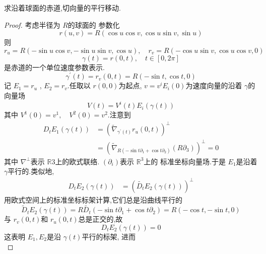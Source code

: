 \documentclass[../../main.tex]{subfiles}
\begin{document}
\begin{problemsec}
    
\end{problemsec}


\begin{problem}
    求沿着球面的赤道,切向量的平行移动.
\end{problem}
\begin{proof}
    考虑半径为 \(  R  \)的球面的 参数化 \[
    r\left( u,v \right)= R\left( \cos u \cos v,\cos u\sin v,\sin u \right) 
    \] 则 \[
    r_{u}= R\left( -\sin u\cos v,-\sin u\sin v,\cos u \right),\quad r_{v}= R\left( -\cos u\sin v,\cos u\cos v,0 \right)  
    \] \[
     \gamma \left( t \right)=  r\left( 0,t \right),\quad t\in [0,2\pi ]  
    \]是赤道的一个单位速度参数表示. \[
     \gamma ^{\prime} \left( t \right)= r_{v}\left( 0,t \right)  = R\left( - \sin t,\cos t,0 \right) 
    \]记 \(  E_1= r_{u}  \) , \(  E_2=  r_{v}  \).任取以 \(  r\left( 0,0 \right)   \)为起点, \(  v= v^{i}E_{i}\left( 0 \right)   \)为速度向量的沿着 \(   \gamma   \)的 向量场 \[
    V\left( t \right)=  V^{i}\left( t \right)E_{i}\left(  \gamma \left( t \right)  \right)  
    \]其中 \(  V^{1}\left( 0 \right)= v^{1},\quad V^{2}\left( 0 \right)= v^{2}    \).注意到 \[
    \begin{aligned}
    D_{t}E_1\left(  \gamma \left( t \right)  \right)&= \left(  \tilde{\nabla} _{ \gamma ^{\prime} \left( t \right) }r_{u}\left( 0,t \right) \right)^{\perp} \\ 
     &=     \left( \tilde{\nabla} _{R\left( -\sin t  \partial _{1}+ \cos t  \partial _{2} \right) }\left( R \partial _{3} \right) \right)^{\perp} = 0
    \end{aligned}
    \] 其中 \(   \nabla ^{\perp}  \)表示 \(  \mathbb{R} 3  \)上的欧式联络.       \(   \left( \partial _{i}   \right) \)表示 \(  \mathbb{R} ^{3}  \)上的  标准坐标向量场.于是 \(  E_1  \)是沿着 \(   \gamma   \)平行的.类似地, \[
    \begin{aligned}
    D_{t}E_2\left(  \gamma \left( t \right)  \right)&= \left( \tilde{D_{t}} E_2\left(  \gamma \left( t \right)  \right) \right)^{\perp}
    \end{aligned} 
    \]  用欧式空间上的标准坐标标架计算,它们总是沿曲线平行的 \[
    \tilde{D}_{t}E_2\left(  \gamma \left( t \right)  \right)=R \tilde{D_{t}} \left( -\sin t  \partial _{1}+ \cos t \partial _{2} \right)= R\left( -\cos t,-\sin t,0 \right)  
    \]与 \(  r_{v}\left( 0,t \right)   \)和 \(  r_{u}\left( 0,t \right)   \)总是正交的,故 \[
    D_{t}E_2\left(  \gamma \left( t \right)  \right)= 0 
    \]这表明 \(  E_1,E_2  \)是沿 \(   \gamma \left( t \right)   \)平行的标架,    进而 \[
\]
\end{proof}
\end{document}
